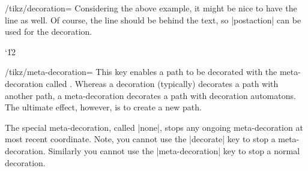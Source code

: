 \begin{key}{/tikz/decoration=}
  Considering the above example, it might be nice to have the line as
  well. Of course, the line should be behind the text, so |postaction|
  can be used for the decoration.
  
\begin{codeexample}[]
\catcode`\|12
\end{codeexample} 
\end{key}

\begin{key}{/tikz/meta-decoration=}
  This key enables a path to be decorated with the meta-decoration
  called . Whereas a decoration (typically) decorates a path
  with another path, a meta-decoration decorates a path with
  decoration automatons. The ultimate effect, however, is to create	a
  new path. 

\begin{codeexample}[]
\end{codeexample}

  The special meta-decoration, called |none|, stops any ongoing 
  meta-decoration	at most recent coordinate. Note, you cannot use
  the |decorate| key to stop a meta-decoration. Similarly you
  cannot use the |meta-decoration| key to stop a normal decoration.
\end{key}



